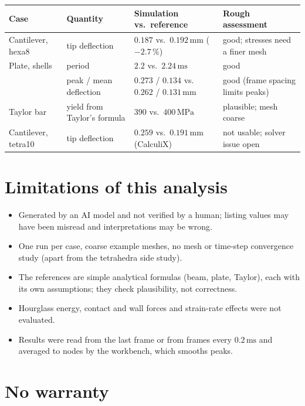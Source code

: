 \documentclass[11pt,a4paper]{article}
\newcommand{\unit}[1]{\,\mathrm{#1}}
\begin{document}
\begin{table}[ht]
\centering\small
\begin{tabularx}{\linewidth}{@{}lllX@{}}
\toprule
Case & Quantity & Simulation vs.\ reference & Rough assessment \\
\midrule
Cantilever, hexa8 & tip deflection & $0.187$ vs.\ $0.192\unit{mm}$ ($-2.7\,\%$) & good; stresses need a finer mesh \\
Plate, shells & period & $2.2$ vs.\ $2.24\unit{ms}$ & good \\
 & peak / mean deflection & $0.273$ / $0.134$ vs.\ $0.262$ / $0.131\unit{mm}$ & good (frame spacing limits peaks) \\
Taylor bar & yield from Taylor's formula & $390$ vs.\ $400\unit{MPa}$ & plausible; mesh coarse \\
Cantilever, tetra10 & tip deflection & $0.259$ vs.\ $0.191\unit{mm}$ (CalculiX) & not usable; solver issue open \\
\bottomrule
\end{tabularx}
\end{table}

\section{Limitations of this analysis}

\begin{itemize}
  \item Generated by an AI model and not verified by a human; listing values may have been misread
        and interpretations may be wrong.
  \item One run per case, coarse example meshes, no mesh or time-step convergence study (apart from
        the tetrahedra side study).
  \item The references are simple analytical formulas (beam, plate, Taylor), each with its own
        assumptions; they check plausibility, not correctness.
  \item Hourglass energy, contact and wall forces and strain-rate effects were not evaluated.
  \item Results were read from the last frame or from frames every $0.2\unit{ms}$ and averaged to
        nodes by the workbench, which smooths peaks.
\end{itemize}

\section{No warranty}
\label{sec:warranty}
\end{document}
